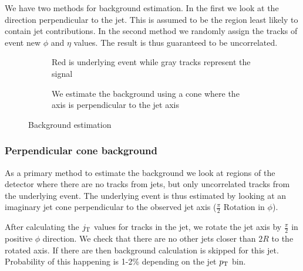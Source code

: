 We have two methods for background estimation. In the first we look at the direction perpendicular to the jet. This is assumed to be the region least likely to contain jet contributions. In the second method we randomly assign the tracks of event new $\phi$ and $\eta$ values. The result is thus guaranteed to be uncorrelated.

\begin{figure}
\centering
\begin{subfigure}{0.4\textwidth}


\caption{Red is underlying event while gray tracks represent the signal}
\end{subfigure}
\begin{subfigure}{0.4\textwidth}


\caption{We estimate the background using a cone where the axis is perpendicular to the jet axis}
\end{subfigure}
\caption{Background estimation}
\label{fig:bgdef}
\end{figure}

\subsubsection{Perpendicular cone background}
As a primary method to estimate the background we look at regions of the detector where there are no tracks from jets, but only uncorrelated tracks from the underlying event. The underlying event is thus estimated by looking at an imaginary jet cone perpendicular to the observed jet axis ($\frac{\pi}{2}$ Rotation in $\phi$). 


After calculating the $j_{\rm T}$ values for tracks in the jet, we rotate the jet axis by $\frac{\pi}{2}$ in positive $\phi$ direction. We check that there are no other jets closer than $2R$ to the rotated axis. If there are then background calculation is skipped for this jet. Probability of this happening is 1-2\% depending on the jet $p_{\rm T}$ bin.

